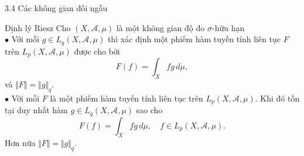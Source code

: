 \documentclass[notheorems,envcountsect,hyperref=unicode]{beamer}
\newcommand{\R}{\mathbb R}
\def\A{\mathcal{A}}
\def\R{\mathbb{R}}
\def\Lpp{\mathit{L_p}}
\def\m{\mu}
\def\disint{\displaystyle\int}
\def\dissum{\displaystyle\sum}
\def\kgdd{(X,\A,\mu)}
\begin{document}
\begin{frame}{3.4 Các không gian đối ngẫu }
\begin{block}{\textnormal{Định lý Riesz}}
Cho $\kgdd$ là một không gian độ đo $\sigma$-hữu hạn\\
$\bullet$ Với mỗi $g\in\mathit{L}_q\kgdd$ thì xác định một phiếm hàm tuyến tính liên tục $F$ trên $\Lpp\kgdd$ được cho bởi
$$F(f)=\disint_X fg\,d\m,$$
và $\Vert F\Vert=\Vert g\Vert_q.$\\
$\bullet$ Với mỗi $F$ là một phiếm hàm tuyến tính liên tục trên $\Lpp\kgdd$. Khi đó tồn tại duy nhất hàm $g\in\mathit{L}_q\kgdd$ sao cho 
$$F(f)=\disint_X fg\,d\m,\quad f\in\Lpp\kgdd.$$
Hơn nữa $\Vert F\Vert=\Vert g\Vert_q$.
\end{block}
\end{frame}

\end{document}
